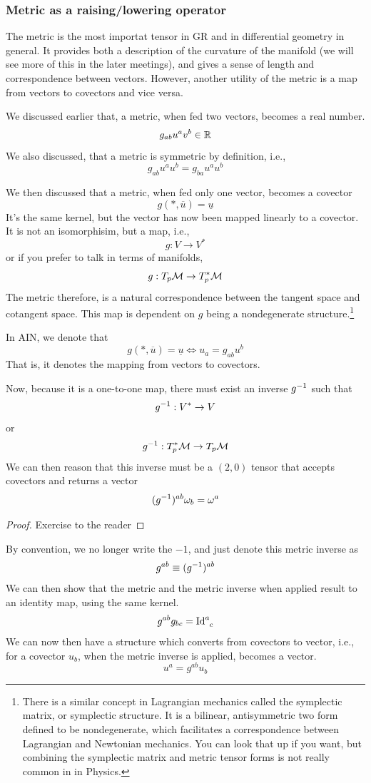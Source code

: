 	\subsubsection{Metric as a raising/lowering operator}
		The metric is the most importat tensor in GR and in differential geometry in general.
		It provides both a description of the curvature of the manifold (we will see more of this in the later meetings),
		and gives a sense of length and correspondence between vectors. However, another 
		utility of the metric is a map from vectors to covectors and vice versa.

		We discussed earlier that, a metric, when fed two vectors, becomes a real number.
		\[
			g_{ab} u^a v^b \in \mathbb{R}
		\]
		We also discussed, that a metric is symmetric by definition, i.e.,
		\[
			g_{ab} u^a u^b = g_{ba} u^a u^b
		\]

		We then discussed that a metric, when fed only one vector, becomes a covector
		\[
			g(*,\overline{u}) = \underline{u}
		\]
		It's the same kernel, but the vector has now been mapped linearly to a covector.
		It is not an isomorphisim, but a map, i.e.,
		\[
			g:V\to V^*
		\]
		or if you prefer to talk in terms of manifolds,
		\[
			g:T_p \mathcal M \to T_p^* \mathcal M
		\]
		The metric therefore, is a natural correspondence between the tangent space
		and cotangent space. This map is dependent on $g$ being a nondegenerate
		structure.\footnote{
			There is a similar concept in Lagrangian mechanics called the symplectic matrix, or symplectic
			structure. It is a bilinear, antisymmetric two form defined to be nondegenerate,
			which facilitates a correspondence between Lagrangian and Newtonian mechanics.
			You can look that up if you want, but combining the symplectic matrix and metric tensor forms 
			is not really common in in Physics.
		}

		In AIN, we denote that
		\[
			g(*,\overline{u}) = \underline{u} \iff u_a = g_{ab} u^b
		\]
		That is, it denotes the mapping from vectors to covectors.

		Now, because it is a one-to-one map, there must exist an inverse $g^{-1}$
		such that
		\[
			g^{-1}:V^*\to V
		\]
		or 
		\[
			g^{-1}:T^*_p\mathcal{M}\to T_p \mathcal{M}
		\]
		We can then reason that this inverse must be a $(2,0)$ tensor that
		accepts covectors and returns a vector
		\[
			(g^{-1})^{ab} \omega_b = \omega^a
		\]
		\begin{proof}
		    Exercise to the reader
		\end{proof}

		By convention, we no longer write the $-1$, and just denote this
		metric inverse as
		\[
			g^{ab} \equiv (g^{-1})^{ab}
		\]
		We can then show that the metric and the metric inverse when 
		applied result to an identity map, using the same kernel.
		\[
			g^{ab}g_{bc} = \Id\indices{^a_c}
		\]
		We can now then have a structure which converts from covectors to vector, i.e.,
		for a covector $u_b$, when the metric inverse is applied, becomes a vector.
		\[
			u^a = g^{ab}u_b
		\]

